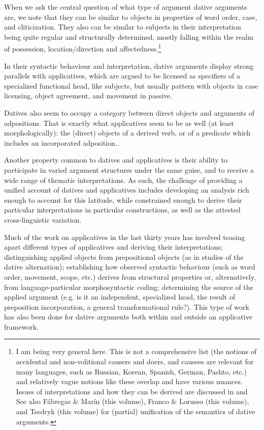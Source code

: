 \documentclass[output=paper,modfonts,nonflat]{langsci/langscibook}
\begin{document}
When we ask the central question of what type of argument dative arguments are, we note that they can be similar to objects in properties of word order, case, and cliticization. They also can be similar to subjects in their interpretation being quite regular and structurally determined, mostly falling within the realm of possession, location/direction and affectedness.\footnote{I am being very general here. This is not a comprehensive list (the notions of accidental and non-volitional causers and doers, and causees are relevant for many languages, such as Russian, Korean, Spanish, German, Pashto, etc.) and relatively vague notions like these overlap and have various nuances. Issues of interpretations and how they can be derived are discussed in  and  See also Fábregas \& Marín (this volume), Franco \& Lorusso (this volume), and Tsedryk (this volume) for (partial) unification of the semantics of dative arguments.}   

In their syntactic behaviour and interpretation, dative arguments display strong parallels with applicatives, which are argued to be licensed as specifiers of a specialized functional head, like subjects, but usually pattern with objects in case licensing, object agreement, and movement in passive.

Datives also seem to occupy a category between direct objects and arguments of adpositions. That is exactly what applicatives seem to be as well (at least morphologically): the (direct) objects of a derived verb, or of a predicate which includes an incorporated adposition.. 

Another property common to datives and applicatives is their ability to participate in varied argument structures under the same guise, and to receive a wide range of thematic interpretations. As such, the challenge of providing a unified account of datives and applicatives includes developing an analysis rich enough to account for this latitude, while constrained enough to derive their particular interpretations in particular constructions, as well as the attested cross-linguistic variation.  

Much of the work on applicatives in the last thirty years has involved teasing apart different types of applicatives and deriving their interpretations; distinguishing applied objects from prepositional objects (as in studies of the dative alternation); establishing how observed syntactic behaviour (such as word order, movement, scope, etc.) derives from structural properties or, alternatively, from language-particular morphosyntactic coding; determining the source of the applied argument (e.g. is it an independent, specialized head, the result of preposition incorporation, a general transformational rule?). This type of work has also been done for dative arguments both within and outside an applicative framework. 
\end{document}
